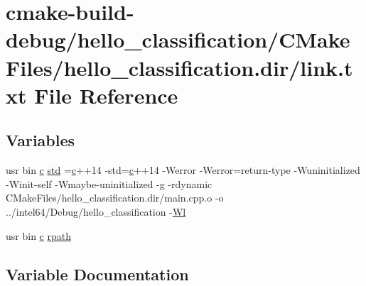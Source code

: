 \hypertarget{hello__classification_2CMakeFiles_2hello__classification_8dir_2link_8txt}{}\section{cmake-\/build-\/debug/hello\+\_\+classification/\+C\+Make\+Files/hello\+\_\+classification.dir/link.txt File Reference}
\label{hello__classification_2CMakeFiles_2hello__classification_8dir_2link_8txt}
\subsection*{Variables}
\begin{DoxyCompactItemize}
\item 
usr bin \hyperlink{CMakeCache_8txt_aac1d6a1710812201527c735f7c6afbaa}{c} \hyperlink{hello__classification_2CMakeFiles_2hello__classification_8dir_2link_8txt_a1ccfea5f558575a112db71eeb271fabf}{std} =\hyperlink{CMakeCache_8txt_aac1d6a1710812201527c735f7c6afbaa}{c}++14 -\/std=\hyperlink{CMakeCache_8txt_aac1d6a1710812201527c735f7c6afbaa}{c}++14 -\/Werror -\/Werror=return-\/type -\/Wuninitialized -\/Winit-\/self -\/Wmaybe-\/uninitialized -\/g -\/rdynamic C\+Make\+Files/hello\+\_\+classification.\+dir/main.\+cpp.\+o -\/o ../intel64/Debug/hello\+\_\+classification -\/\hyperlink{thirdparty_2extension_2CMakeFiles_2cpu__extension_8dir_2link_8txt_af9ccbf658ed2deb89d0d79f211e5b033}{Wl}
\item 
usr bin \hyperlink{CMakeCache_8txt_aac1d6a1710812201527c735f7c6afbaa}{c} \hyperlink{hello__classification_2CMakeFiles_2hello__classification_8dir_2link_8txt_ab9d7fd7120fafa2118a4e08c1df697c7}{rpath}
\end{DoxyCompactItemize}


\subsection{Variable Documentation}
